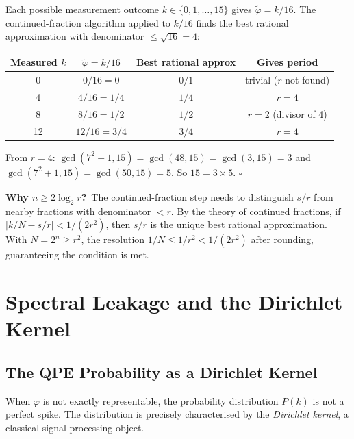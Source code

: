 \documentclass[12pt,a4paper]{article}
\begin{document}
Each possible measurement outcome $k \in \{0,1,\ldots,15\}$ gives
$\tilde\varphi = k/16$.  The continued-fraction algorithm applied to $k/16$
finds the best rational approximation with denominator $\leq \sqrt{16}=4$:

\begin{center}
\begin{tabular}{@{}cccc@{}}
\toprule
Measured $k$ & $\tilde\varphi = k/16$ & Best rational approx & Gives period \\
\midrule
0  & $0/16 = 0$   & $0/1$  & trivial ($r$ not found) \\
4  & $4/16 = 1/4$ & $1/4$  & $r = 4$ \\
8  & $8/16 = 1/2$ & $1/2$  & $r = 2$ (divisor of 4) \\
12 & $12/16 = 3/4$& $3/4$  & $r = 4$ \\
\bottomrule
\end{tabular}
\end{center}

From $r=4$: $\gcd(7^2-1, 15) = \gcd(48, 15) = \gcd(3, 15) = 3$ and
$\gcd(7^2+1, 15) = \gcd(50, 15) = 5$.  So $15 = 3\times 5$. $\square$

\begin{tcolorbox}[insight]
  \textbf{Why $n \geq 2\log_2 r$?}\ The continued-fraction step needs to
  distinguish $s/r$ from nearby fractions with denominator $< r$.
  By the theory of continued fractions, if $|k/N - s/r| < 1/(2r^2)$,
  then $s/r$ is the unique best rational approximation.
  With $N = 2^n \geq r^2$, the resolution $1/N \leq 1/r^2 < 1/(2r^2)$
  after rounding, guaranteeing the condition is met.
\end{tcolorbox}

\newpage

\section{Spectral Leakage and the Dirichlet Kernel}
\label{app:leakage}

\subsection{The QPE Probability as a Dirichlet Kernel}

When $\varphi$ is not exactly representable, the probability distribution
$P(k)$ is not a perfect spike.  The distribution is precisely characterised
by the \emph{Dirichlet kernel}, a classical signal-processing object.
\end{document}
